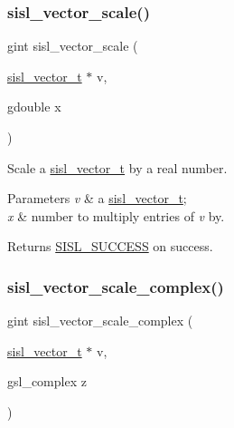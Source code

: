 \subsubsection{\texorpdfstring{sisl\+\_\+vector\+\_\+scale()}{sisl\_vector\_scale()}}
{\footnotesize\ttfamily gint sisl\+\_\+vector\+\_\+scale (\begin{DoxyParamCaption}\item[{\mbox{\hyperlink{group__vector_gacbac585492f5005f05f0c0b8463039be}{sisl\+\_\+vector\+\_\+t}} $\ast$}]{v,  }\item[{gdouble}]{x }\end{DoxyParamCaption})}

Scale a \mbox{\hyperlink{group__vector_gacbac585492f5005f05f0c0b8463039be}{sisl\+\_\+vector\+\_\+t}} by a real number.


\begin{DoxyParams}{Parameters}
{\em v} & a \mbox{\hyperlink{group__vector_gacbac585492f5005f05f0c0b8463039be}{sisl\+\_\+vector\+\_\+t}}; \\
\hline
{\em x} & number to multiply entries of {\itshape v} by.\\
\hline
\end{DoxyParams}
\begin{DoxyReturn}{Returns}
\mbox{\hyperlink{group__status_gga82c112a16803c9ddebc065a1b0f16287a60b9f04752a2c4dd6214f8a4fd7d913b}{S\+I\+S\+L\+\_\+\+S\+U\+C\+C\+E\+SS}} on success. 
\end{DoxyReturn}
\mbox{\label{group__vector_ga57a386cd94671f45ee0ad4d2d0f6b863}} 
\subsubsection{\texorpdfstring{sisl\+\_\+vector\+\_\+scale\+\_\+complex()}{sisl\_vector\_scale\_complex()}}
{\footnotesize\ttfamily gint sisl\+\_\+vector\+\_\+scale\+\_\+complex (\begin{DoxyParamCaption}\item[{\mbox{\hyperlink{group__vector_gacbac585492f5005f05f0c0b8463039be}{sisl\+\_\+vector\+\_\+t}} $\ast$}]{v,  }\item[{gsl\+\_\+complex}]{z }\end{DoxyParamCaption})}

